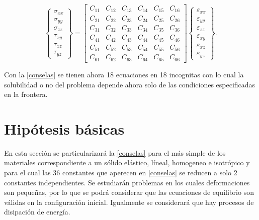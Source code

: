 \documentclass[../notas medios.tex]{subfiles}
\begin{document}
\begin{equation}
\left\{ {\begin{array}{*{20}{c}}
{{\sigma _{xx}}}\\
{{\sigma _{yy}}}\\
{{\sigma _{zz}}}\\
{{\tau _{xy}}}\\
{{\tau _{xz}}}\\
{{\tau _{yz}}}
\end{array}} \right\} = \left[ {\begin{array}{*{20}{c}}
{{C_{11}}}&{{C_{12}}}&{{C_{13}}}&{{C_{14}}}&{{C_{15}}}&{{C_{16}}}\\
{{C_{21}}}&{{C_{22}}}&{{C_{23}}}&{{C_{24}}}&{{C_{25}}}&{{C_{26}}}\\
{{C_{31}}}&{{C_{32}}}&{{C_{33}}}&{{C_{34}}}&{{C_{35}}}&{{C_{36}}}\\
{{C_{41}}}&{{C_{42}}}&{{C_{43}}}&{{C_{44}}}&{{C_{45}}}&{{C_{46}}}\\
{{C_{51}}}&{{C_{52}}}&{{C_{53}}}&{{C_{54}}}&{{C_{55}}}&{{C_{56}}}\\
{{C_{61}}}&{{C_{62}}}&{{C_{63}}}&{{C_{64}}}&{{C_{65}}}&{{C_{66}}}
\end{array}} \right]\left\{ {\begin{array}{*{20}{c}}
{{\varepsilon _{xx}}}\\
{{\varepsilon _{yy}}}\\
{{\varepsilon _{zz}}}\\
{{\varepsilon _{xy}}}\\
{{\varepsilon _{xz}}}\\
{{\varepsilon _{yz}}}
\end{array}} \right\}.
\label{conselas}
\end{equation}

Con la \cref{conselas} se tienen ahora 18 ecuaciones en 18 incognitas con lo cual la solubilidad o no del problema depende ahora solo de las condiciones especificadas en la frontera. 
%
\section{Hipótesis básicas}

En esta sección se particularizará la \cref{conselas} para el más simple de los materiales correspondiente a un sólido elástico, líneal, homogeneo e isotrópico y para el cual las 36 constantes que aperecen en \cref{conselas} se reducen a solo 2 constantes independientes. Se estudiarán problemas en los cuales deformaciones son pequeñas, por lo que se podrá considerar que las ecuaciones de equilibrio son válidas en la configuración inicial. Igualmente se considerará que hay procesos de disipación de energía. 
\end{document}
